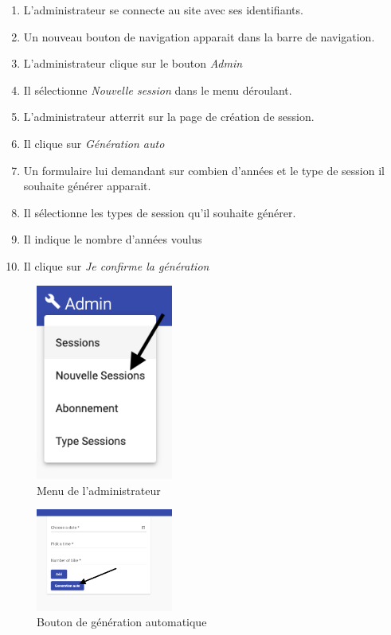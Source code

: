 \begin{enumerate}
	\item L'administrateur se connecte au site avec ses identifiants. 
	\item Un nouveau bouton de navigation apparait dans la barre de navigation. 
	\item L'administrateur clique sur le bouton \textit{Admin}
	\item Il sélectionne \textit{Nouvelle session} dans le menu déroulant. 
	\item L'administrateur atterrit sur la page de création de session. 
	\item Il clique sur \textit{Génération auto}
	\item Un formulaire lui demandant sur combien d'années et le type de session il souhaite générer apparait.
	\item Il sélectionne les types de session qu'il souhaite générer.
	\item Il indique le nombre d'années voulus
	\item Il clique sur \textit{Je confirme la génération} 
\end{enumerate}

\vspace{\baselineskip}
\begin{figure}[h]
	\includegraphics[width=0.4\textwidth,center]{Figures/us16-1}
	\caption{Menu de l'administrateur}
\end{figure}

\newpage
\begin{figure}[h]
	\includegraphics[width=0.4\textwidth,center]{Figures/us16-2}
	\caption{Bouton de génération automatique}
\end{figure}

